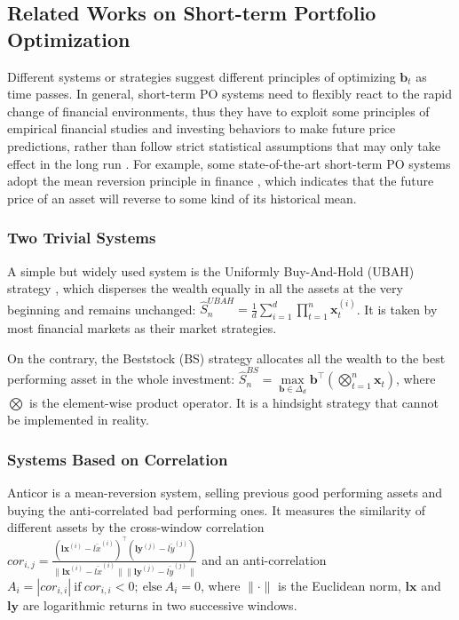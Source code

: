 \documentclass[twoside,11pt]{article}
\begin{document}
\subsection{Related Works on Short-term Portfolio Optimization}
\label{sec:relateworkshort}
Different systems or strategies suggest different principles of optimizing $\mathbf{b}_t$ as time passes. In general, short-term PO systems need to flexibly react to the rapid change of financial environments, thus they have to exploit some principles of empirical financial studies \citep{MR1,MR2,olpssurvey,olpsjmlr} and investing behaviors \citep{behavioralfinance,stockoverreact,trend0} to make future price predictions, rather than follow strict statistical assumptions that may only take effect in the long run \citep{olazyupdate}. For example, some state-of-the-art short-term PO systems adopt the mean reversion principle in finance \citep{MR1,MR2,PAMR,CWMR,OLMAR,RMR2}, which indicates that the future price of an asset will reverse to some kind of its historical mean. 


\subsubsection{Two Trivial Systems}
\label{sec:twotrivial}
A simple but widely used system is the Uniformly Buy-And-Hold (UBAH) strategy \citep{olpssurvey}, which disperses the wealth equally in all the assets at the very beginning and remains unchanged: $\hat{S}_n^{UBAH} = \frac{1}{d} \sum_{i=1}^d \prod_{t=1}^n \mathbf{x}_t^{(i)}$. It is taken by most financial markets as their market strategies. 

On the contrary, the Beststock (BS) strategy \citep{olpssurvey} allocates all the wealth to the best performing asset in the whole investment: $\hat{S}_n^{BS} = \max\limits_{\mathbf{b}\in\Delta_d}\mathbf{b}^\top(\bigotimes_{t=1}^n\mathbf{x}_t)$, where $\bigotimes$ is the element-wise product operator. It is a hindsight strategy that cannot be implemented in reality. 


\subsubsection{Systems Based on Correlation}
\label{sec:corrsystem}
Anticor \citep{anticor} is a mean-reversion system, selling previous good performing assets and buying the anti-correlated bad performing ones. It measures the similarity of different assets by the cross-window correlation $cor_{i,j}=\frac{(\mathbf{lx}^{(i)}-\bar{lx}^{(i)})^\top (\mathbf{ly}^{(j)}-\bar{ly}^{(j)})}{\|\mathbf{lx}^{(i)}-\bar{lx}^{(i)}\|\|\mathbf{ly}^{(j)}-\bar{ly}^{(j)}\|}$ and an anti-correlation $A_i=|cor_{i,i}| \: \text{if} \: cor_{i,i}<0;\:\text{else}\: A_i=0$, where $\|\cdot\|$ is the Euclidean norm, $\mathbf{lx}$ and $\mathbf{ly}$ are logarithmic returns in two successive windows. 
\end{document}
